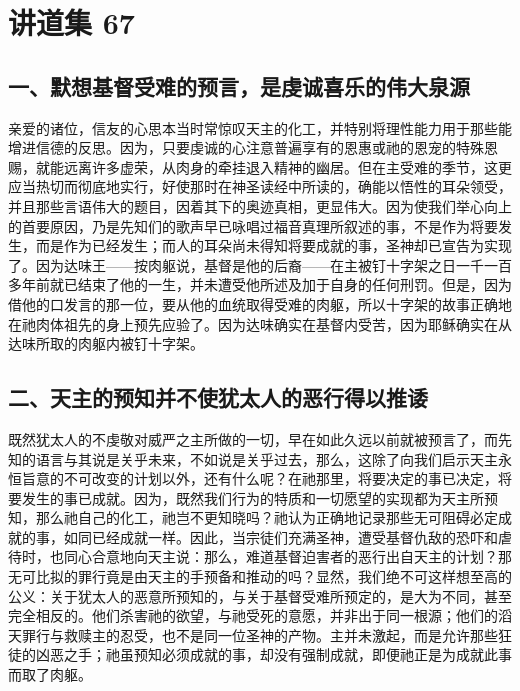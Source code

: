 
\section{讲道集 67}

\par


\subsection{一、默想基督受难的预言，是虔诚喜乐的伟大泉源}

亲爱的诸位，信友的心思本当时常惊叹天主的化工，并特别将理性能力用于那些能增进信德的反思。因为，只要虔诚的心注意普遍享有的恩惠或祂的恩宠的特殊恩赐，就能远离许多虚荣，从肉身的牵挂退入精神的幽居。但在主受难的季节，这更应当热切而彻底地实行，好使那时在神圣读经中所读的，确能以悟性的耳朵领受，并且那些言语伟大的题目，因着其下的奥迹真相，更显伟大。因为使我们举心向上的首要原因，乃是先知们的歌声早已咏唱过福音真理所叙述的事，不是作为将要发生，而是作为已经发生；而人的耳朵尚未得知将要成就的事，圣神却已宣告为实现了。因为达味王——按肉躯说，基督是他的后裔——在主被钉十字架之日一千一百多年前就已结束了他的一生，并未遭受他所述及加于自身的任何刑罚。但是，因为借他的口发言的那一位，要从他的血统取得受难的肉躯，所以十字架的故事正确地在祂肉体祖先的身上预先应验了。因为达味确实在基督内受苦，因为耶稣确实在从达味所取的肉躯内被钉十字架。\par


\subsection{二、天主的预知并不使犹太人的恶行得以推诿}

既然犹太人的不虔敬对威严之主所做的一切，早在如此久远以前就被预言了，而先知的语言与其说是关乎未来，不如说是关乎过去，那么，这除了向我们启示天主永恒旨意的不可改变的计划以外，还有什么呢？在祂那里，将要决定的事已决定，将要发生的事已成就。因为，既然我们行为的特质和一切愿望的实现都为天主所预知，那么祂自己的化工，祂岂不更知晓吗？祂认为正确地记录那些无可阻碍必定成就的事，如同已经成就一样。因此，当宗徒们充满圣神，遭受基督仇敌的恐吓和虐待时，也同心合意地向天主说：那么，难道基督迫害者的恶行出自天主的计划？那无可比拟的罪行竟是由天主的手预备和推动的吗？显然，我们绝不可这样想至高的公义：关于犹太人的恶意所预知的，与关于基督受难所预定的，是大为不同，甚至完全相反的。他们杀害祂的欲望，与祂受死的意愿，并非出于同一根源；他们的滔天罪行与救赎主的忍受，也不是同一位圣神的产物。主并未激起，而是允许那些狂徒的凶恶之手；祂虽预知必须成就的事，却没有强制成就，即便祂正是为成就此事而取了肉躯。\par

